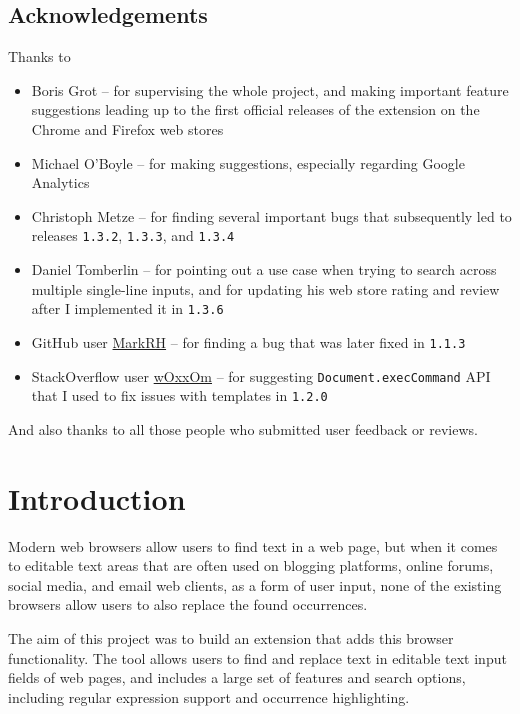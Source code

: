 \documentclass[bsc,frontabs,twoside,singlespacing,parskip,deptreport]{infthesis}
\begin{document}
\section*{Acknowledgements}
Thanks to
\begin{itemize}
\item
  Boris Grot -- for supervising the whole project, and making important feature suggestions leading up to the first official releases of the extension on the Chrome and Firefox web stores
\item
  Michael O'Boyle -- for making suggestions, especially regarding Google Analytics
\item
  Christoph Metze -- for finding several important bugs that subsequently led to releases \texttt{1.3.2}, \texttt{1.3.3}, and \texttt{1.3.4}
\item
  Daniel Tomberlin -- for pointing out a use case when trying to search across multiple single-line inputs, and for updating his web store rating and review after I implemented it in \texttt{1.3.6}
\item
  GitHub user \href{https://github.com/MarkRH}{MarkRH} -- for finding a bug that was later fixed in \texttt{1.1.3}
\item
  StackOverflow user \href{https://stackoverflow.com/users/3959875/woxxom}{wOxxOm} -- for suggesting \texttt{Document.execCommand} API that I used to fix issues with templates in \texttt{1.2.0}
\end{itemize}

And also thanks to all those people who submitted user feedback or
reviews.

\standarddeclaration

\tableofcontents
\listoffigures

\chapter{Introduction} %
Modern web browsers allow users to find text in a web page, but when it comes to editable text areas that are often used on blogging platforms, online forums, social media, and email web clients, as a form of user input, none of the existing browsers allow users to also replace the found occurrences.
 
The aim of this project was to build an extension that adds this browser functionality. The tool allows users to find and replace text in editable text input fields of web pages, and includes a large set of features and search options, including regular expression support and occurrence highlighting.
\end{document}
